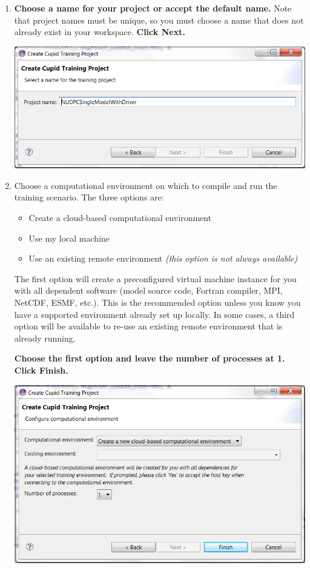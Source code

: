 \documentclass[oneside,11pt]{memoir}
\begin{document}
\begin{enumerate}
\item \textbf{Choose a name for your project or accept the default name.}  Note that project names must be unique, so you must choose a name that does not already exist in your workspace.  \textbf{Click Next.}

\parbox{\linewidth}{\centering
  \includegraphics[width=\textwidth]{figs/cloud_fig3.png}
}

\item Choose a computational environment on which to compile and run the training scenario.  The three options are:

\begin{itemize}
\item Create a cloud-based computational environment
\item Use my local machine
\item Use an existing remote environment \emph{(this option is not always available)}
\end{itemize}

The first option will create a preconfigured virtual machine instance for you with all dependent software (model source code, Fortran compiler, MPI, NetCDF, ESMF, etc.). This is the recommended option unless you know you have a supported environment already set up locally.  In some cases, a third option will be available to re-use an existing remote environment that is already running. 

\textbf{Choose the first option and leave the number of processes at 1.  Click Finish.}

\parbox{\linewidth}{\centering
  \includegraphics[width=\textwidth]{figs/cloud_fig4.png}
}


\end{enumerate}
\end{document}
